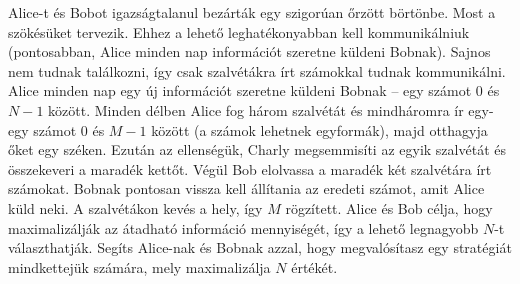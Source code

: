 \documentclass[12pt]{article}
\begin{document}
\renewcommand{\round}{Day 1}
\renewcommand{\problemName}{Task Prison}
\renewcommand{\lang}{Hungarian [HUN]}

\renewcommand{\tl}{$2$ sec.}
\renewcommand{\ml}{$1024$ MB}

Alice-t és Bobot igazságtalanul bezárták egy szigorúan őrzött börtönbe. Most a szökésüket tervezik. Ehhez a lehető leghatékonyabban kell kommunikálniuk (pontosabban, Alice minden nap információt szeretne küldeni Bobnak). Sajnos nem tudnak találkozni, így csak szalvétákra írt számokkal tudnak kommunikálni. Alice minden nap egy új információt szeretne küldeni Bobnak -- egy számot $0$ és $N-1$ között. Minden délben Alice fog három szalvétát és mindháromra ír egy-egy számot $0$ és $M-1$ között (a számok lehetnek egyformák), majd otthagyja őket egy széken. Ezután az ellenségük, Charly megsemmisíti az egyik szalvétát és összekeveri a maradék kettőt. Végül Bob elolvassa a maradék két szalvétára írt számokat. Bobnak pontosan vissza kell állítania az eredeti számot, amit Alice küld neki. A szalvétákon kevés a hely, így $M$ rögzített. Alice és Bob célja, hogy maximalizálják az átadható információ mennyiségét, így a lehető legnagyobb $N$-t választhatják. Segíts Alice-nak és Bobnak azzal, hogy megvalósítasz egy stratégiát mindkettejük számára, mely maximalizálja $N$ értékét.

\end{document}
